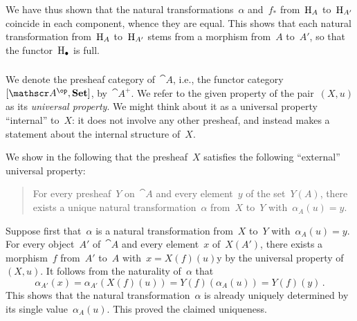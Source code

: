 We have thus shown that the natural transformations~$α$ and~$f_*$ from~$\mathrm{H}_A$ to~$\mathrm{H}_{A'}$ coincide in each component, whence they are equal.
This shows that each natural transformation from~$\mathrm{H}_A$ to~$\mathrm{H}_{A'}$ stems from a morphism from~$A$ to~$A'$, so that the functor~$\mathrm{H}_{\bullet}$ is full.



\subsubsection{}

We denote the presheaf category of~$\cat{A}$, i.e., the functor category~$[\cat{A}^{\op}, \Set]$, by~$\cat{A}^+$.
We refer to the given property of the pair~$(X, u)$ as its \emph{universal property}.
We might think about it as a universal property \enquote{internal} to~$X$:
it does not involve any other presheaf, and instead makes a statement about the internal structure of~$X$.

We show in the following that the presheaf~$X$ satisfies the following \enquote{external} universal property:
\begin{quote}
	For every presheaf~$Y$ on~$\cat{A}$ and every element~$y$ of the set~$Y(A)$, there exists a unique natural transformation~$α$ from~$X$ to~$Y$ with~$α_A(u) = y$.
\end{quote}

Suppose first that~$α$ is a natural transformation from~$X$ to~$Y$ with~$α_A(u) = y$.
For every object~$A'$ of~$\cat{A}$ and every element~$x$ of~$X(A')$, there exists a morphism~$f$ from~$A'$ to~$A$ with~$x = X(f)(u)$y by the universal property of~$(X, u)$.
It follows from the naturality of~$α$ that
\[
	α_{A'}(x)
	=
	α_{A'}(X(f)(u))
	=
	Y(f)(α_A(u))
	=
	Y(f)(y) \,.
\]
This shows that the natural transformation~$α$ is already uniquely determined by its single value~$α_A(u)$.
This proved the claimed uniqueness.


